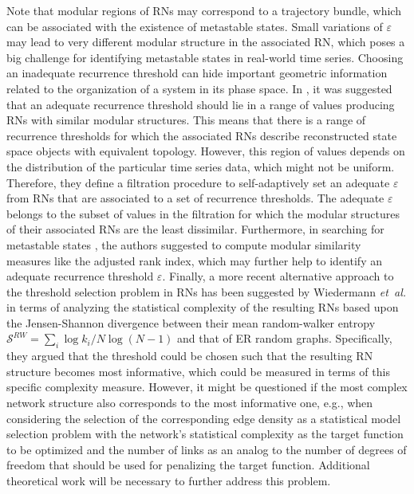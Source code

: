 		 Note that modular regions of RNs may correspond to a trajectory bundle, which can be associated with the existence of metastable states. Small variations of $\varepsilon$ may lead to very different modular structure in the associated RN, which poses a big challenge for identifying metastable states in real-world time series. Choosing an inadequate recurrence threshold can hide important geometric information related to the organization of a system in its phase space. In \cite{Vega2016}, it was suggested that an adequate recurrence threshold should lie in a range of values producing RNs with similar modular structures. This means that there is a range of recurrence thresholds for which the associated RNs describe reconstructed state space objects with equivalent topology. However, this region of values depends on the distribution of the particular time series data, which might not be uniform. Therefore, they define a filtration procedure to self-adaptively set an adequate $\varepsilon$ from RNs that are associated to a set of recurrence thresholds. The adequate $\varepsilon$ belongs to the subset of values in the filtration for which the modular structures of their associated RNs are the least dissimilar. Furthermore, in searching for metastable states \cite{Vega2016}, the authors suggested to compute modular similarity measures like the adjusted rank index, which may further help to identify an adequate recurrence threshold $\varepsilon$.
Finally, a more recent alternative approach to the threshold selection problem in RNs has been suggested by Wiedermann \emph{et~al.} \cite{Wiedermann2017} in terms of analyzing the statistical complexity of the resulting RNs based upon the Jensen-Shannon divergence between their mean random-walker entropy $\mathcal{S}^{RW}=\sum_{i} \log k_i /N\log(N-1)$ and that of ER random graphs. Specifically, they argued that the threshold could be chosen such that the resulting RN structure becomes most informative, which could be measured in terms of this specific complexity measure. However, it might be questioned if the most complex network structure also corresponds to the most informative one, e.g., when considering the selection of the corresponding edge density as a statistical model selection problem with the network's statistical complexity as the target function to be optimized and the number of links as an analog to the number of degrees of freedom that should be used for penalizing the target function. Additional theoretical work will be necessary to further address this problem.



